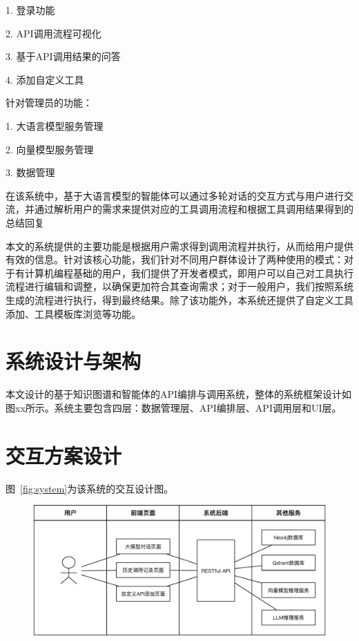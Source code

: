 1. 登录功能

2. API调用流程可视化

3. 基于API调用结果的问答

4. 添加自定义工具

针对管理员的功能：

1. 大语言模型服务管理

2. 向量模型服务管理

3. 数据管理

在该系统中，基于大语言模型的智能体可以通过多轮对话的交互方式与用户进行交流，并通过解析用户的需求来提供对应的工具调用流程和根据工具调用结果得到的总结回复

本文的系统提供的主要功能是根据用户需求得到调用流程并执行，从而给用户提供有效的信息。针对该核心功能，我们针对不同用户群体设计了两种使用的模式：对于有计算机编程基础的用户，我们提供了开发者模式，即用户可以自己对工具执行流程进行编辑和调整，以确保更加符合其查询需求；对于一般用户，我们按照系统生成的流程进行执行，得到最终结果。除了该功能外，本系统还提供了自定义工具添加、工具模板库浏览等功能。

\section{系统设计与架构}
本文设计的基于知识图谱和智能体的API编排与调用系统，整体的系统框架设计如图xx所示。系统主要包含四层：数据管理层、API编排层、API调用层和UI层。

\section{交互方案设计}

图~\ref{fig:system}为该系统的交互设计图。

\begin{figure}[!htp]
    \vspace{1em}
    \centering
    \setlength{\abovecaptionskip}{10pt} %
    \includegraphics[height=5cm]{../assets/ch5-交互设计图.pdf}
    \label{fig:interaction}
  \end{figure}

